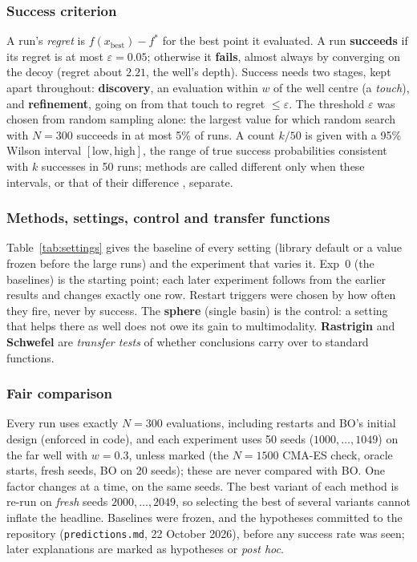 \documentclass[10pt,a4paper]{article}
\begin{document}
\subsubsection{Success criterion}
A run's \emph{regret} is $f(x_{\text{best}})-f^\ast$ for the best point it evaluated. A run \textbf{succeeds} if its regret is at most $\varepsilon=0.05$; otherwise it \textbf{fails}, almost always by converging on the decoy (regret about $2.21$, the well's depth). Success needs two stages, kept apart throughout: \textbf{discovery}, an evaluation within $w$ of the well centre (a \emph{touch}), and \textbf{refinement}, going on from that touch to regret $\le\varepsilon$. The threshold $\varepsilon$ was chosen from random sampling alone: the largest value for which random search with $N=300$ succeeds in at most 5\% of runs. A count $k/50$ is given with a 95\% Wilson interval \citep{newcombe1998single} $[\text{low},\text{high}]$, the range of true success probabilities consistent with $k$ successes in 50 runs; methods are called different only when these intervals, or that of their difference \citep{newcombe1998difference}, separate.

\subsubsection{Methods, settings, control and transfer functions}
Table~\ref{tab:settings} gives the baseline of every setting (library default or a value frozen before the large runs) and the experiment that varies it. Exp~0 (the baselines) is the starting point; each later experiment follows from the earlier results and changes exactly one row. Restart triggers were chosen by how often they fire, never by success. The \textbf{sphere} (single basin) is the control: a setting that helps there as well does not owe its gain to multimodality. \textbf{Rastrigin} and \textbf{Schwefel} are \emph{transfer tests} of whether conclusions carry over to standard functions.

\subsubsection{Fair comparison}
Every run uses exactly $N=300$ evaluations, including restarts and BO's initial design (enforced in code), and each experiment uses 50 seeds ($1000,\dots,1049$) on the far well with $w=0.3$, unless marked (the $N=1500$ CMA-ES check, oracle starts, fresh seeds, BO on 20 seeds); these are never compared with BO. One factor changes at a time, on the same seeds. The best variant of each method is re-run on \emph{fresh} seeds $2000,\dots,2049$, so selecting the best of several variants cannot inflate the headline. Baselines were frozen, and the hypotheses committed to the repository (\texttt{predictions.md}, 22 October 2026), before any success rate was seen; later explanations are marked as hypotheses or \emph{post hoc}.
\end{document}
